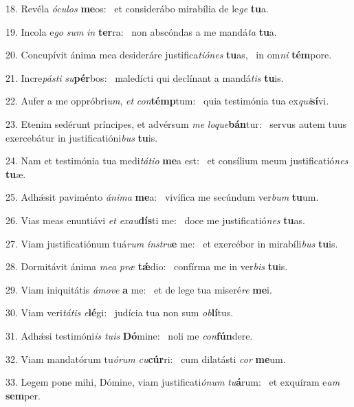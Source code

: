 18. Revéla \textit{ó}\textit{cu}\textit{los} \textbf{me}os: \ast\  et considerábo mirabília de le\textit{ge} \textbf{tu}a.\

19. Incola e\textit{go} \textit{sum} \textit{in} \textbf{ter}ra: \ast\  non abscóndas a me mandá\textit{ta} \textbf{tu}a.\

20. Concupívit ánima mea desideráre justifica\textit{ti}\textit{ó}\textit{nes} \textbf{tu}as, \ast\  in om\textit{ni} \textbf{tém}pore.\

21. Incre\textit{pás}\textit{ti} \textit{su}\textbf{pér}bos: \ast\  maledícti qui declínant a mandá\textit{tis} \textbf{tu}is.\

22. Aufer a me oppróbri\textit{um}, \textit{et} \textit{con}\textbf{témp}tum: \ast\  quia testimónia tua ex\textit{qui}\textbf{sí}vi.\

23. Etenim sedérunt príncipes, et advérsum \textit{me} \textit{lo}\textit{que}\textbf{bán}tur: \ast\  servus autem tuus exercebátur in justificatióni\textit{bus} \textbf{tu}is.\

24. Nam et testimónia tua medi\textit{tá}\textit{ti}\textit{o} \textbf{me}a est: \ast\  et consílium meum justificatió\textit{nes} \textbf{tu}æ.\

25. Adhǽsit paviménto \textit{á}\textit{ni}\textit{ma} \textbf{me}a: \ast\  vivífica me secúndum ver\textit{bum} \textbf{tu}um.\

26. Vias meas enuntiávi \textit{et} \textit{ex}\textit{au}\textbf{dís}ti me: \ast\  doce me justificatió\textit{nes} \textbf{tu}as.\

27. Viam justificatiónum tuá\textit{rum} \textit{ín}\textit{stru}\textbf{e} me: \ast\  et exercébor in mirabíli\textit{bus} \textbf{tu}is.\

28. Dormitávit ánima \textit{me}\textit{a} \textit{præ} \textbf{tǽ}dio: \ast\  confírma me in ver\textit{bis} \textbf{tu}is.\

29. Viam iniquitátis \textit{á}\textit{mo}\textit{ve} \textbf{a} me: \ast\  et de lege tua miseré\textit{re} \textbf{me}i.\

30. Viam veri\textit{tá}\textit{tis} \textit{e}\textbf{lé}gi: \ast\  judícia tua non sum \textit{ob}\textbf{lí}tus.\

31. Adhǽsi testimóni\textit{is} \textit{tu}\textit{is} \textbf{Dó}mine: \ast\  noli me \textit{con}\textbf{fún}dere.\

32. Viam mandatórum tu\textit{ó}\textit{rum} \textit{cu}\textbf{cúr}ri: \ast\  cum dilatásti \textit{cor} \textbf{me}um.\

33. Legem pone mihi, Dómine, viam justificati\textit{ó}\textit{num} \textit{tu}\textbf{á}rum: \ast\  et exquíram e\textit{am} \textbf{sem}per.\

